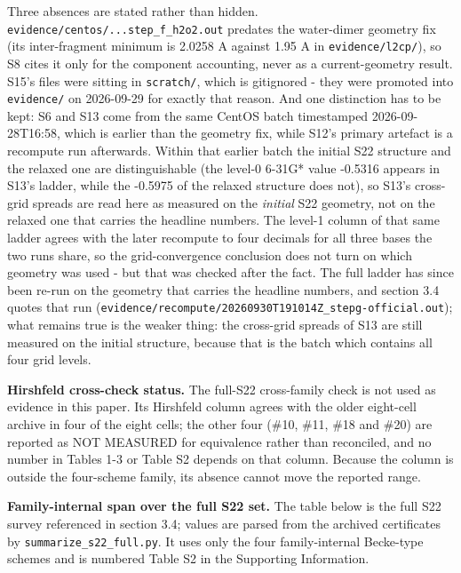 \documentclass[11pt]{article}
\begin{document}
Three absences are stated rather than hidden. \texttt{evidence/\allowbreak{}centos/\allowbreak{}...step\_\allowbreak{}f\_\allowbreak{}h2o2.out} predates the water-dimer geometry fix (its inter-fragment minimum is 2.0258 A against 1.95 A in \texttt{evidence/l2cp/}), so S8 cites it only for the component accounting, never as a current-geometry result. S15's files were sitting in \texttt{scratch/}, which is gitignored - they were promoted into \texttt{evidence/} on 2026-09-29 for exactly that reason. And one distinction has to be kept: S6 and S13 come from the same CentOS batch timestamped 2026-09-28T16:58, which is earlier than the geometry fix, while S12's primary artefact is a recompute run afterwards. Within that earlier batch the initial S22 structure and the relaxed one are distinguishable (the level-0 6-31G* value -0.5316 appears in S13's ladder, while the -0.5975 of the relaxed structure does not), so S13's cross-grid spreads are read here as measured on the \emph{initial} S22 geometry, not on the relaxed one that carries the headline numbers. The level-1 column of that same ladder agrees with the later recompute to four decimals for all three bases the two runs share, so the grid-convergence conclusion does not turn on which geometry was used - but that was checked after the fact. The full ladder has since been re-run on the geometry that carries the headline numbers, and section 3.4 quotes that run (\texttt{evidence/\allowbreak{}recompute/\allowbreak{}20260930T191014Z\_\allowbreak{}stepg-official.out}); what remains true is the weaker thing: the cross-grid spreads of S13 are still measured on the initial structure, because that is the batch which contains all four grid levels.

\textbf{Hirshfeld cross-check status.} The full-S22 cross-family check is not used as evidence in this paper. Its Hirshfeld column agrees with the older eight-cell archive in four of the eight cells; the other four (\#10, \#11, \#18 and \#20) are reported as NOT MEASURED for equivalence rather than reconciled, and no number in Tables 1-3 or Table S2 depends on that column. Because the column is outside the four-scheme family, its absence cannot move the reported range.

\textbf{Family-internal span over the full S22 set.} The table below is the full S22 survey referenced in section 3.4; values are parsed from the archived certificates by \texttt{summarize\_s22\_full.py}. It uses only the four family-internal Becke-type schemes and is numbered Table S2 in the Supporting Information.
\end{document}
